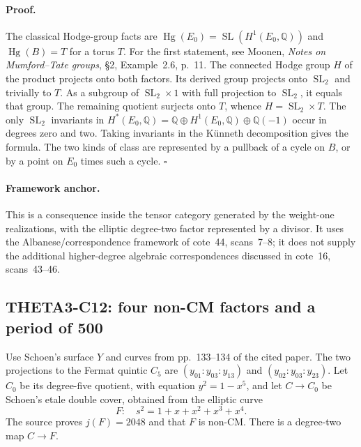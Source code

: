 \documentclass[11pt]{article}
\newcommand{\Q}{\mathbb Q}\newcommand{\C}{\mathbb C}\newcommand{\Z}{\mathbb Z}\newcommand{\R}{\mathbb R}\newcommand{\A}{\mathbb A}\newcommand{\OO}{\mathcal O}
\theoremstyle{definition}\newtheorem{definition}[theorem]{Definition}\newtheorem{remark}[theorem]{Remark}
\begin{document}
\paragraph{Proof.}
The classical Hodge-group facts are
$\operatorname{Hg}(E_0)=\operatorname{SL}(H^1(E_0,\Q))$ and
$\operatorname{Hg}(B)=T$ for a torus $T$. For the first statement,
see Moonen, \emph{Notes on Mumford--Tate groups}, \S2,
Example~2.6, p.~11. The connected Hodge group $H$ of the product
projects onto both factors. Its derived group projects onto
$\operatorname{SL}_2$ and trivially to $T$. As a subgroup of
$\operatorname{SL}_2\times1$ with full projection to
$\operatorname{SL}_2$, it equals that group. The remaining quotient
surjects onto $T$, whence $H=\operatorname{SL}_2\times T$.
The only $\operatorname{SL}_2$ invariants in
$H^*(E_0,\Q)=\Q\oplus H^1(E_0,\Q)\oplus\Q(-1)$ occur in degrees
zero and two. Taking invariants in the K\"unneth decomposition gives
the formula. The two kinds of class are represented by a pullback of
a cycle on $B$, or by a point on $E_0$ times such a cycle. $\square$

\paragraph{Framework anchor.}
This is a consequence inside the tensor category generated by the
weight-one realizations, with the elliptic degree-two factor represented
by a divisor.  It uses the Albanese/correspondence framework of cote~44,
scans~7--8; it does not supply the additional higher-degree algebraic
correspondences discussed in cote~16, scans~43--46.



\subsection{THETA3-C12: four non-CM factors and a period of 500}\label{C12}
Use Schoen's surface $Y$ and curves from pp.~133--134 of the cited paper. The two projections to the Fermat quintic $C_5$ are
$(y_{01}:y_{03}:y_{13})$ and $(y_{02}:y_{03}:y_{23})$.
Let $C_0$ be its degree-five quotient, with equation $y^2=1-x^5$, and let $C\to C_0$ be Schoen's etale double cover, obtained from the elliptic curve
\[
 F:\quad s^2=1+x+x^2+x^3+x^4.
\]
The source proves $j(F)=2048$ and that $F$ is non-CM. There is a degree-two map $C\to F$.
\end{document}
